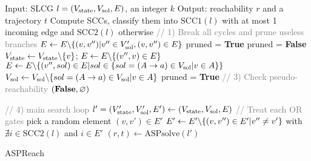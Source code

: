 \begin{algorithm}[ht]
\begin{algorithmic}
    \State Input: SLCG $l=(V_{\mathrm{state}},V_{\mathrm{sol}}, E)$, an integer $k$
    \State Output: reachability $r$ and a trajectory $t$
    \State Compute SCCs, classify them into $\mathrm{SCC1}(l)$ with at most 1 incoming edge and $\mathrm{SCC2}(l)$ otherwise
    \State \textcolor{gray}{// 1) Break all cycles and prune useless branches}\label{delete_cycle_begin}
            \State $E\gets E\miset{(v,v'')|v''\in V'_\sol,(v,v'')\in E}$
        \EndIf
    \EndFor
    \EndFor \label{delete_cycle_end}
    \State{\textcolor{gray}{// 2) remove useless nodes/edges}} \label{prune_begin}
    \State pruned = \textbf{True}
        \State pruned = \textbf{False}
                \State $V_\st \gets V_\st\miset{v}$; $E\gets E\miset{(v'',v)\in E}$
                \State $E\gets E\miset{(v'',sol)\in E | sol \in \{sol = (A \rightarrow a) \in V_\sol | v \in A\}}$
                \State $V_{\mathrm{sol}} \gets V_{\mathrm{sol}}\backslash \{sol = (A \rightarrow a) \in V_{\mathrm{sol}} | v \in A\}$
                \State pruned = \textbf{True}
            \EndIf
        \EndFor \label{prune_end}
    \EndWhile
    \State \textcolor{gray}{// 3) Check pseudo-reachability} \label{pseudo_reach_begin}
        \State \Return $(\mathbf{False},\varnothing)$
    \EndIf \label{pseudo_reach_end}
    
    \State \textcolor{gray}{// 4) main search loop} \label{main_loop_begin}
        \State $l'=(V'_{\mathrm{state}}, V'_{\mathrm{sol}},E')\gets(V_{\mathrm{state}}, V_{\mathrm{sol}},E)$ 
         \textcolor{gray}{// Treat each OR gates}
            \State pick a random element $(v,v') \in E'$
            \State $E'\gets E' \miset{(v,v'') \in E'| v''\neq v'}$ with $\nexists i\in \mathrm{SCC2}(l)$ and $i\in E'$
        \EndFor
        \State $(r,t)\gets\mathrm{ASPsolve}(l')$
            \State{}
        \EndIf
    \EndFor \label{main_loop_end}
    \State {}
\end{algorithmic}
\caption{ASPReach}\label{algOverall}
\end{algorithm}

